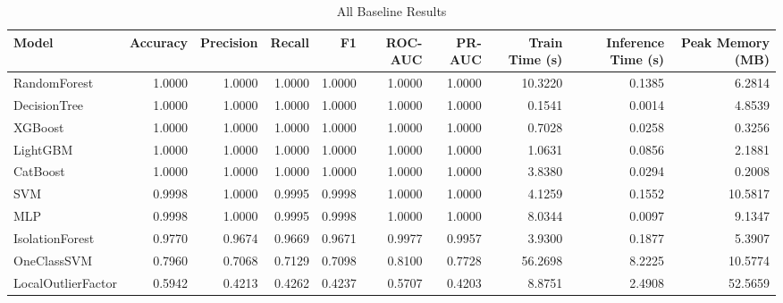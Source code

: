 \begin{table}
\caption{All Baseline Results}
\label{tab:all_baseline_results}
\begin{tabular}{lrrrrrrrrr}
\toprule
Model & Accuracy & Precision & Recall & F1 & ROC-AUC & PR-AUC & Train Time (s) & Inference Time (s) & Peak Memory (MB) \\
\midrule
RandomForest & 1.0000 & 1.0000 & 1.0000 & 1.0000 & 1.0000 & 1.0000 & 10.3220 & 0.1385 & 6.2814 \\
DecisionTree & 1.0000 & 1.0000 & 1.0000 & 1.0000 & 1.0000 & 1.0000 & 0.1541 & 0.0014 & 4.8539 \\
XGBoost & 1.0000 & 1.0000 & 1.0000 & 1.0000 & 1.0000 & 1.0000 & 0.7028 & 0.0258 & 0.3256 \\
LightGBM & 1.0000 & 1.0000 & 1.0000 & 1.0000 & 1.0000 & 1.0000 & 1.0631 & 0.0856 & 2.1881 \\
CatBoost & 1.0000 & 1.0000 & 1.0000 & 1.0000 & 1.0000 & 1.0000 & 3.8380 & 0.0294 & 0.2008 \\
SVM & 0.9998 & 1.0000 & 0.9995 & 0.9998 & 1.0000 & 1.0000 & 4.1259 & 0.1552 & 10.5817 \\
MLP & 0.9998 & 1.0000 & 0.9995 & 0.9998 & 1.0000 & 1.0000 & 8.0344 & 0.0097 & 9.1347 \\
IsolationForest & 0.9770 & 0.9674 & 0.9669 & 0.9671 & 0.9977 & 0.9957 & 3.9300 & 0.1877 & 5.3907 \\
OneClassSVM & 0.7960 & 0.7068 & 0.7129 & 0.7098 & 0.8100 & 0.7728 & 56.2698 & 8.2225 & 10.5774 \\
LocalOutlierFactor & 0.5942 & 0.4213 & 0.4262 & 0.4237 & 0.5707 & 0.4203 & 8.8751 & 2.4908 & 52.5659 \\
\bottomrule
\end{tabular}
\end{table}
